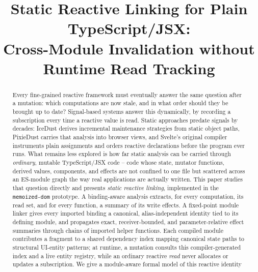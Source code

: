 \documentclass[conference]{IEEEtran}
\begin{document}
\title{Static Reactive Linking for Plain TypeScript/JSX:\\
Cross-Module Invalidation without Runtime Read Tracking}

\author{
}

\maketitle

\begin{abstract}
Every fine-grained reactive framework must eventually answer the same
question after a mutation: which computations are now stale, and in what
order should they be brought up to date? Signal-based systems answer this
dynamically, by recording a subscription every time a reactive value is read.
Static approaches predate signals by decades: IceDust derives incremental
maintenance strategies from static object paths, PixieDust carries that
analysis into browser views, and Svelte's original compiler instruments plain
assignments and orders reactive declarations before the program ever runs.
What remains less explored is how far static analysis can be carried through
\emph{ordinary}, mutable TypeScript/JSX code -- code whose state, mutator
functions, derived values, components, and effects are not confined to one
file but scattered across an ES-module graph the way real applications are
actually written. This paper studies that question directly and presents
\emph{static reactive linking}, implemented in the \texttt{memoized-dom}
prototype. A binding-aware analysis extracts, for every computation, its read
set, and for every function, a summary of its write effects. A fixed-point
module linker gives every imported binding a canonical, alias-independent
identity tied to its defining module, and propagates exact, receiver-bounded,
and parameter-relative effect summaries through chains of imported helper
functions. Each compiled module contributes a fragment to a shared dependency
index mapping canonical state paths to structural UI-entity patterns; at
runtime, a mutation consults this compiler-generated index and a live entity
registry, while an ordinary reactive \emph{read} never allocates or updates a
subscription. We give a module-aware formal model of this reactive identity

\end{abstract}
\end{document}
